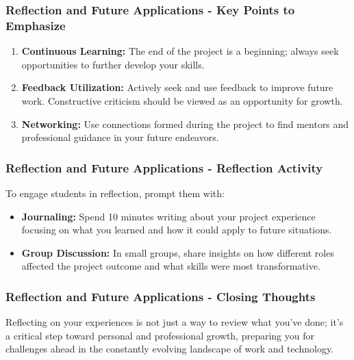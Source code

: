 \documentclass[aspectratio=169]{beamer}
\begin{document}
\begin{frame}[fragile]
    \frametitle{Reflection and Future Applications - Key Points to Emphasize}
    \begin{enumerate}
        \item \textbf{Continuous Learning:} The end of the project is a beginning; always seek opportunities to further develop your skills.
        \item \textbf{Feedback Utilization:} Actively seek and use feedback to improve future work. Constructive criticism should be viewed as an opportunity for growth.
        \item \textbf{Networking:} Use connections formed during the project to find mentors and professional guidance in your future endeavors.
    \end{enumerate}
\end{frame}

\begin{frame}[fragile]
    \frametitle{Reflection and Future Applications - Reflection Activity}
    To engage students in reflection, prompt them with:
    \begin{itemize}
        \item \textbf{Journaling:} Spend 10 minutes writing about your project experience focusing on what you learned and how it could apply to future situations.
        \item \textbf{Group Discussion:} In small groups, share insights on how different roles affected the project outcome and what skills were most transformative.
    \end{itemize}
\end{frame}

\begin{frame}[fragile]
    \frametitle{Reflection and Future Applications - Closing Thoughts}
    Reflecting on your experiences is not just a way to review what you've done; it's a critical step toward personal and professional growth, preparing you for challenges ahead in the constantly evolving landscape of work and technology.
\end{frame}
\end{document}
